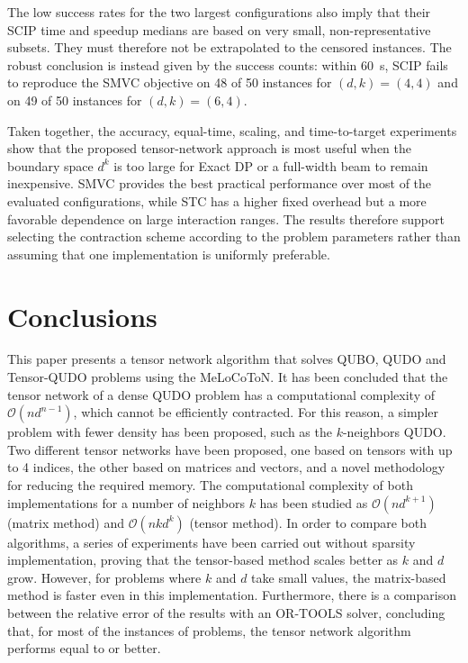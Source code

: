 \documentclass[%
 reprint,
 amsmath,amssymb,
 aps,
 pra,showkeys,
]{revtex4-2}
\begin{document}
The low success rates for the two largest configurations also imply
that their SCIP time and speedup medians are based on very small,
non-representative subsets. They must therefore not be extrapolated to
the censored instances. The robust conclusion is instead given by the
success counts: within 60~s, SCIP fails to reproduce the SMVC objective
on 48 of 50 instances for $(d,k)=(4,4)$ and on 49 of 50 instances for
$(d,k)=(6,4)$.

Taken together, the accuracy, equal-time, scaling, and time-to-target
experiments show that the proposed tensor-network approach is most
useful when the boundary space $d^k$ is too large for Exact DP or a
full-width beam to remain inexpensive. SMVC provides the best practical
performance over most of the evaluated configurations, while STC has a
higher fixed overhead but a more favorable dependence on large
interaction ranges. The results therefore support selecting the
contraction scheme according to the problem parameters rather than
assuming that one implementation is uniformly preferable.

\section{Conclusions}\label{sec:conclusions}
This paper presents a tensor network algorithm that solves QUBO, QUDO and Tensor-QUDO problems using the MeLoCoToN. It has been concluded that the tensor network of a dense QUDO problem has a computational complexity of $\mathcal{O}(nd^{n-1})$, which cannot be efficiently contracted. For this reason, a simpler problem with fewer density has been proposed, such as the $k$-neighbors QUDO. Two different tensor networks have been proposed, one based on tensors with up to 4 indices, the other based on matrices and vectors, and a novel methodology for reducing the required memory. The computational complexity of both implementations for a number of neighbors $k$ has been studied as $\mathcal{O}(nd^{k+1})$ (matrix method) and $\mathcal{O}(nkd^{k})$ (tensor method). In order to compare both algorithms, a series of experiments have been carried out without sparsity implementation, proving that the tensor-based method scales better as $k$ and $d$ grow. However, for problems where $k$ and $d$ take small values, the matrix-based method is faster even in this implementation. Furthermore, there is a comparison between the relative error of the results with an OR-TOOLS solver, concluding that, for most of the instances of problems, the tensor network algorithm performs equal to or better.
\end{document}
